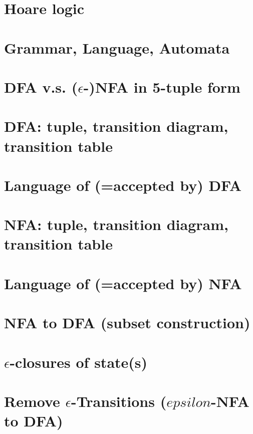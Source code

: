 \documentclass[10pt,a4paper,landscape]{article}
\begin{document}
\pagestyle{empty}

\begin{multicols*}{3}
\section*{Hoare logic}
% 

\section*{Grammar, Language, Automata}
% 

\section*{DFA v.s. (\(\epsilon\)-)NFA in 5-tuple form}
% 

\section*{DFA: tuple, transition diagram, transition table}
% 

\section*{Language of (=accepted by) DFA}


\section*{NFA: tuple, transition diagram, transition table}
% 

\section*{Language of (=accepted by) NFA}


\section*{NFA to DFA (subset construction)}
% 

\section*{\(\epsilon\)-closures of state(s)}
% 

\section*{Remove \(\epsilon\)-Transitions (\(epsilon\)-NFA to DFA)}
% 


\end{multicols*}
\end{document}
